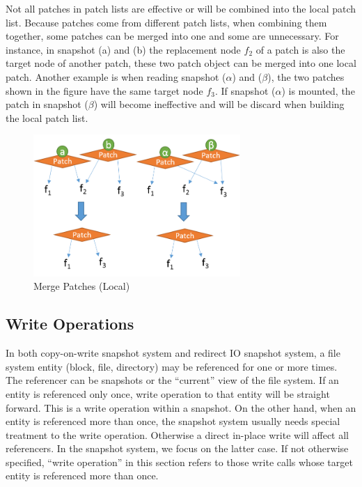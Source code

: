     Not all patches in patch lists are effective or will be combined into the local patch list. Because patches come from different patch lists, when combining them together, some patches can be merged into one and some are unnecessary. For instance, in  snapshot (a) and (b) the replacement node $f_2$ of a patch is also the target node of another patch, these two patch object can be merged into one local patch. Another example is when reading snapshot ($\alpha$) and ($\beta$), the two patches shown in the figure have the same target node $f_3$. If snapshot ($\alpha$) is mounted, the patch in snapshot ($\beta$) will become ineffective and will be discard when building the local patch list.

\begin{figure}[t]
\centering
\includegraphics[width=0.7\textwidth]{Chapter-4/figs/fig19.png}
\caption{Merge Patches (Local)}
\label{fig:merge}
\end{figure}

\subsection{Write Operations}

    In both copy-on-write snapshot system and redirect IO snapshot system, a file system entity (block, file, directory) may be referenced for one or more times. The referencer can be snapshots or the ``current'' view of the file system. If an entity is referenced only once, write operation to that entity will be straight forward. This is a write operation within a snapshot. On the other hand, when an entity is referenced more than once, the snapshot system usually needs special treatment to the write operation. Otherwise a direct in-place write will affect all referencers. In the snapshot system, we focus on the latter case. If not otherwise specified, ``write operation'' in this section refers to those write calls whose target entity is referenced more than once.

